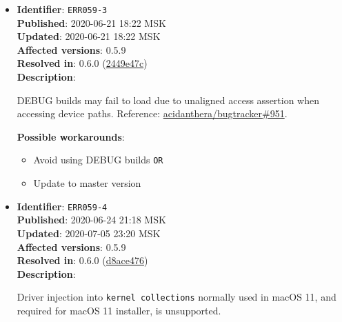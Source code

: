 \documentclass[]{article}
\providecommand{\tightlist}{%
  \setlength{\itemsep}{0pt}\setlength{\parskip}{0pt}}
\begin{document}
\begin{itemize}
  \textbf{Possible workarounds}:
  \begin{itemize}
    \tightlist
    \item Add \texttt{run-efi-updater} variable with \texttt{NO} string value \texttt{OR}
    \item Install Windows on a separate disk \texttt{OR}
    \item Update to master version
  \end{itemize}


\item
  \textbf{Identifier}: \texttt{ERR059-3} \\
  \textbf{Published}: 2020-06-21 18:22 MSK \\
  \textbf{Updated}: 2020-06-21 18:22 MSK \\
  \textbf{Affected versions}: 0.5.9 \\
  \textbf{Resolved in}: 0.6.0 (\href{https://github.com/acidanthera/MaxRegnerPkg/commit/2449e47cb2d110a288d491beee0b5b168d2bb480}{2449e47c}) \\
  \textbf{Description}:

  DEBUG builds may fail to load due to unaligned access assertion when accessing device paths.
  Reference: \href{https://github.com/acidanthera/bugtracker/issues/951}{acidanthera/bugtracker\#951}.

  \textbf{Possible workarounds}:
  \begin{itemize}
    \tightlist
    \item Avoid using DEBUG builds \texttt{OR}
    \item Update to master version
  \end{itemize}


\item
  \textbf{Identifier}: \texttt{ERR059-4} \\
  \textbf{Published}: 2020-06-24 21:18 MSK \\
  \textbf{Updated}: 2020-07-05 23:20 MSK \\
  \textbf{Affected versions}: 0.5.9 \\
  \textbf{Resolved in}: 0.6.0 (\href{https://github.com/acidanthera/MaxRegnerPkg/commit/d8ace476067ebb4b5abe17e4cdcd094fa3641689}{d8ace476}) \\
  \textbf{Description}:

  Driver injection into \texttt{kernel collections} normally used in macOS 11,
  and required for macOS 11 installer, is unsupported.


\end{itemize}
\end{document}
